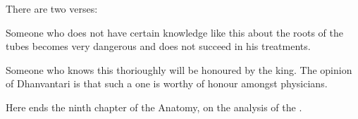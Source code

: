 \begin{refsection}
\begin{translation}
\item[13.add1, 13.add2]
There are two verses:

\begin{sloka}
    Someone who does not have certain knowledge like this about the
roots of the tubes becomes very dangerous and does not succeed in
his treatments.
    
Someone who knows this thorioughly will be honoured by the king. 
The opinion of Dhanvantari is that such a one is worthy of  honour
amongst physicians.
\end{sloka}
\bigskip
{\centering
Here ends the ninth chapter of the Anatomy, on the analysis of the
.
\par}

\end{translation}

\printbibliography
\end{refsection}